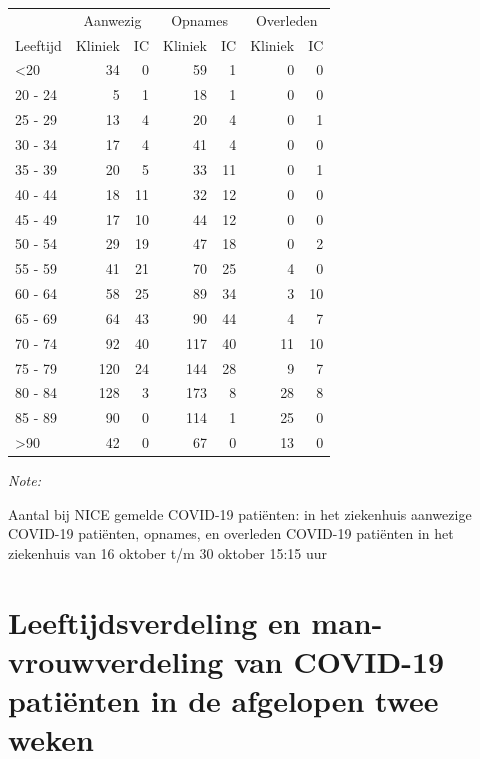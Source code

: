 \documentclass[
  english,
  man,floatsintext]{apa6}
\begin{document}
\begin{table}
\centering\begingroup\fontsize{10}{12}\selectfont

\begin{threeparttable}
\begin{tabular}{lrrrrrr}
\toprule
\multicolumn{1}{c}{ } & \multicolumn{2}{c}{Aanwezig} & \multicolumn{2}{c}{Opnames} & \multicolumn{2}{c}{Overleden} \\
\cmidrule(l{3pt}r{3pt}){2-3} \cmidrule(l{3pt}r{3pt}){4-5} \cmidrule(l{3pt}r{3pt}){6-7}
Leeftijd & Kliniek & IC & Kliniek & IC & Kliniek & IC\\
\midrule
<20 & 34 & 0 & 59 & 1 & 0 & 0\\
20 - 24 & 5 & 1 & 18 & 1 & 0 & 0\\
25 - 29 & 13 & 4 & 20 & 4 & 0 & 1\\
30 - 34 & 17 & 4 & 41 & 4 & 0 & 0\\
35 - 39 & 20 & 5 & 33 & 11 & 0 & 1\\
40 - 44 & 18 & 11 & 32 & 12 & 0 & 0\\
45 - 49 & 17 & 10 & 44 & 12 & 0 & 0\\
50 - 54 & 29 & 19 & 47 & 18 & 0 & 2\\
55 - 59 & 41 & 21 & 70 & 25 & 4 & 0\\
60 - 64 & 58 & 25 & 89 & 34 & 3 & 10\\
65 - 69 & 64 & 43 & 90 & 44 & 4 & 7\\
70 - 74 & 92 & 40 & 117 & 40 & 11 & 10\\
75 - 79 & 120 & 24 & 144 & 28 & 9 & 7\\
80 - 84 & 128 & 3 & 173 & 8 & 28 & 8\\
85 - 89 & 90 & 0 & 114 & 1 & 25 & 0\\
>90 & 42 & 0 & 67 & 0 & 13 & 0\\
\bottomrule
\end{tabular}
\begin{tablenotes}
\item \textit{Note: } 
\item Aantal bij NICE gemelde COVID-19 patiënten: in het ziekenhuis aanwezige COVID-19 patiënten, opnames, en overleden COVID-19 patiënten in het ziekenhuis van 16 oktober t/m 30 oktober 15:15 uur
\end{tablenotes}
\end{threeparttable}
\endgroup{}
\end{table}

\newpage

\hypertarget{leeftijdsverdeling-en-man-vrouwverdeling-van-covid-19-patiuxebnten-in-de-afgelopen-twee-weken}{%
\section{Leeftijdsverdeling en man-vrouwverdeling van COVID-19 patiënten in de afgelopen twee weken}\label{leeftijdsverdeling-en-man-vrouwverdeling-van-covid-19-patiuxebnten-in-de-afgelopen-twee-weken}}
\end{document}

